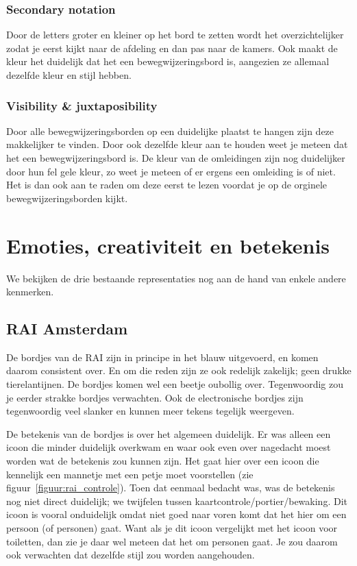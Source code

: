 \subsubsection{Secondary notation}

Door de letters groter en kleiner op het bord te zetten wordt het overzichtelijker zodat je eerst kijkt naar de afdeling en dan pas naar de kamers. Ook maakt de kleur het duidelijk dat het een bewegwijzeringsbord is, aangezien ze allemaal dezelfde kleur en stijl hebben.


\subsubsection{Visibility \& juxtaposibility}

Door alle bewegwijzeringsborden op een duidelijke plaatst te hangen zijn deze makkelijker te vinden. Door ook dezelfde kleur aan te houden weet je meteen dat het een bewegwijzeringsbord is. De kleur van de omleidingen zijn nog duidelijker door hun fel gele kleur, zo weet je meteen of er ergens een omleiding is of niet. Het is dan ook aan te raden om deze eerst te lezen voordat je op de orginele bewegwijzeringsborden kijkt.


\section{Emoties, creativiteit en betekenis}

We bekijken de drie bestaande representaties nog aan de hand van enkele andere kenmerken.


\subsection{RAI Amsterdam}

De bordjes van de RAI zijn in principe in het blauw uitgevoerd, en komen daarom consistent over. En om die reden zijn ze ook redelijk zakelijk; geen drukke tierelantijnen. De bordjes komen wel een beetje oubollig over. Tegenwoordig zou je eerder strakke bordjes verwachten. Ook de electronische bordjes zijn tegenwoordig veel slanker en kunnen meer tekens tegelijk weergeven.

De betekenis van de bordjes is over het algemeen duidelijk. Er was alleen een icoon die minder duidelijk overkwam en waar ook even over nagedacht moest worden wat de betekenis zou kunnen zijn. Het gaat hier over een icoon die kennelijk een mannetje met een petje moet voorstellen (zie figuur~\ref{figuur:rai_controle}). Toen dat eenmaal bedacht was, was de betekenis nog niet direct duidelijk; we twijfelen tussen kaartcontrole/portier/bewaking. Dit icoon is vooral onduidelijk omdat niet goed naar voren komt dat het hier om een persoon (of personen) gaat. Want als je dit icoon vergelijkt met het icoon voor toiletten, dan zie je daar wel meteen dat het om personen gaat. Je zou daarom ook verwachten dat dezelfde stijl zou worden aangehouden.

